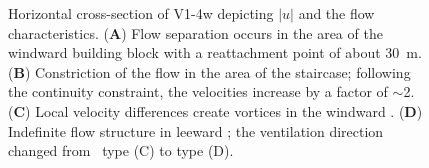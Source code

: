 \begin{figure}[!hb]
	\captionsetup{format=plain}
	\caption[Flow characteristics of V1-4w]{Horizontal cross-section of V1-4w depicting  $|u|$ and the flow characteristics. (\textbf{A}) Flow separation occurs in the area of the windward building block with a reattachment point of about \SI{30}{m}. (\textbf{B}) Constriction of the flow in the area of the staircase; following the continuity constraint,  the velocities increase by a factor of $\sim$\num{2}. (\textbf{C}) Local velocity differences create vortices in the windward \CR. (\textbf{D}) Indefinite flow structure in leeward \CR; the ventilation direction changed from \CR\ type (C) to type (D).}
	\label{fig:V1-4w_flow_field}	
\end{figure}
